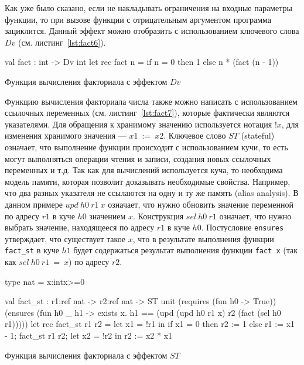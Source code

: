 Как уже было сказано, если не накладывать ограничения на входные параметры функции, то при вызове функции с отрицательным аргументом программа зациклится. Данный эффект можно отобразить с использованием ключевого слова $Dv$ (см. листинг~\ref{lst:fact6}).

\begin{listing}
\begin{pyglist}[language=ocaml,numbers=none,numbersep=5pt, fontsize=\small]
val fact : int -> Dv int 
let rec fact n =
    if n = 0 then 1 else n * (fact (n - 1))
\end{pyglist}
\caption{Функция вычисления факториала с эффектом $Dv$}
\label{lst:fact6} 
\end{listing}

Функцию вычисления факториала числа также можно написать с использованием ссылочных переменных (см. листинг~\ref{lst:fact7}), которые фактически являются указателями. Для обращения к хранимому значению используется нотация $!x$, для изменения хранимого значения --- $x1~:=~x2$. Ключевое слово $ST$ (stateful) означает, что выполнение функции происходит с использованием кучи, то есть могут выполняться операции чтения и записи, создания новых ссылочных переменных и т.д. Так как для вычислений используется куча, то необходима модель памяти, которая позволит доказывать необходимые свойства. Например, что два разных указателя не ссылаются на одну и ту же память (alias analysis). В данном примере $upd~h0~r1~x$ означает, что нужно обновить значение переменной по адресу $r1$ в куче $h0$ значением $x$. Конструкция $sel~h0~r1$ означает, что нужно выбрать значение, находящееся по адресу $r1$ в куче $h0$. Постусловие \verb|ensures| утверждает, что существует такое $x$, что в результате выполнения функции \verb|fact_st| в куче $h1$ будет содержаться результат выполнения функции \verb|fact x| (так как $sel~h0~r1~=~x$) по адресу $r2$.

\begin{listing}
\begin{pyglist}[language=ocaml,numbers=none,numbersep=5pt, fontsize=\small]
type nat = x:int{x>=0} 

val fact_st : r1:ref nat -> r2:ref nat -> ST unit
    (requires (fun h0 -> True))
    (ensures (fun h0 _ h1 -> 
    exists x. h1 == (upd (upd h0 r1 x) r2 (fact (sel h0 r1)))))
let rec fact_st r1 r2 =
  let x1 = !r1 in
  if x1 = 0 
  then r2 := 1
  else
     r1 := x1 - 1;
     fact_st r1 r2;
     let x2 = !r2 in
     r2 := x2 * x1
\end{pyglist}
\caption{Функция вычисления факториала с эффектом $ST$}
\label{lst:fact7} 
\end{listing}

